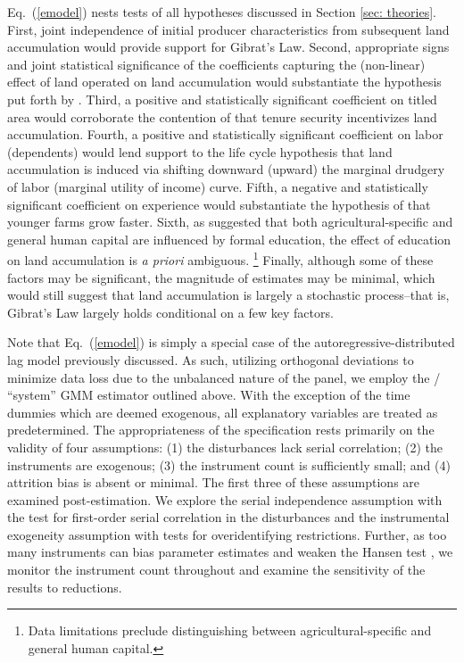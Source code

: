 \documentclass[english]{article}
\begin{document}
Eq.\ (\ref{emodel}) nests tests of all hypotheses discussed in Section 
\ref{sec: theories}. 
First, joint independence of initial producer characteristics from 
subsequent land accumulation would provide support for Gibrat's Law.
Second, appropriate signs and joint statistical significance of the coefficients 
capturing the (non-linear) effect of land operated on land accumulation 
would substantiate the hypothesis put forth by \citet{carter1993}.
Third, a positive and statistically significant coefficient on titled area would 
corroborate the contention of \citet{carter1998b} that tenure security 
incentivizes land accumulation.
Fourth, a positive and statistically significant coefficient on labor 
(dependents) would lend support to the life cycle hypothesis that land 
accumulation is induced via shifting downward (upward) the marginal 
drudgery of labor (marginal utility of income) curve.
Fifth, a negative and statistically significant coefficient on experience 
would substantiate the hypothesis of \citet{jovanovic1982} that younger 
farms grow faster. 
Sixth, as \citet{rodgers1994} suggested that both agricultural-specific and
general human capital are influenced by formal education, the effect of 
education on land accumulation is \emph{a priori} ambiguous.%
\footnote{Data limitations preclude distinguishing between 
agricultural-specific and general human capital.}
Finally, although some of these factors may be significant, the magnitude of 
estimates may be minimal, which would still suggest that land accumulation 
is largely a stochastic process--that is, Gibrat's Law largely holds conditional 
on a few key factors.

Note that Eq.\ (\ref{emodel}) is simply a special case of the 
autoregressive-distributed lag model previously discussed. 
As such, utilizing orthogonal deviations to minimize data loss due to the 
unbalanced nature of the panel, we employ the 
\citet{arellano1995}/\citet{blundell1998} ``system'' GMM estimator 
outlined above. 
With the exception of the time dummies which are deemed exogenous, all 
explanatory variables are treated as predetermined. 
The appropriateness of the specification rests primarily on the validity of 
four assumptions: (1) the disturbances lack serial correlation; (2) the 
instruments are exogenous; (3) the instrument count is sufficiently small; 
and (4) attrition bias is absent or minimal. 
The first three of these assumptions are examined post-estimation.
We explore the serial independence assumption with the \citet{arellano1991} 
test for first-order serial correlation in the disturbances and the instrumental 
exogeneity assumption with \citet{hansen1982} tests for overidentifying 
restrictions. 
Further, as too many instruments can bias parameter estimates and weaken 
the Hansen test \citep{roodman2009b}, we monitor the instrument count 
throughout and examine the sensitivity of the results to reductions.
\end{document}

